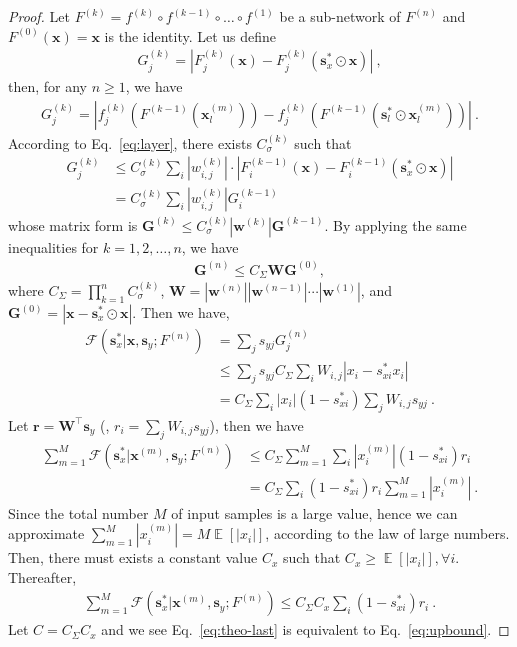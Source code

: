 \documentclass[10pt,twocolumn,letterpaper]{article}
\def\mb{\mathbf}
\begin{document}
\begin{proof}Let $F^{(k)}=f^{(k)}\circ f^{(k-1)}\circ\dots\circ f^{(1)}$ be a sub-network of $F^{(n)}$ and $F^{(0)}(\mb x)=\mb x$ is the identity. Let us define
\begin{align}
G^{(k)}_j=|F_{j}^{(k)}(\mb x)-F_{j}^{(k)}(\mb s^*_x\odot\mb x)|~,\nonumber
\end{align}
then, for any $n\ge 1$, we have
\begin{align}
    G^{(k)}_j=|f^{(k)}_j(F^{(k-1)}(\mb x^{(m)}_l))-f^{(k)}_j(F^{(k-1)}(\mb s^*_l\odot\mb x^{(m)}_l))|\nonumber~.
    \end{align}
    According to Eq.~\ref{eq:layer}, there exists $C_\sigma^{(k)}$ such that
    \begin{align}
    G^{(k)}_j
    &\le C_\sigma^{(k)}\sum_{i}|w_{i,j}^{(k)}|\cdot|F^{(k-1)}_{i}(\mb x)-F_{i}^{(k-1)}(\mb s^*_x\odot\mb x)|\nonumber\\
    &= C_\sigma^{(k)}\sum_{i}|w_{i,j}^{(k)}|G^{(k-1)}_i\nonumber
\end{align}
whose matrix form is
$\mb G^{(k)}\le C_\sigma^{(k)}|\mb w^{(k)}|\mb G^{(k-1)}$.
By applying the same inequalities for $k=1,2,\ldots,n$, we have
\begin{align}
\mb G^{(n)}\le C_\Sigma\mb W\mb G^{(0)},\nonumber
\end{align}
where $C_\Sigma=\prod_{k=1}^n C_\sigma^{(k)}$, $\mb W=|\mb w^{(n)}||\mb w^{(n-1)}|\cdots|\mb w^{(1)}|$, and $\mb G^{(0)}=|\mb x - \mb s^*_x\odot\mb x|$. Then we have,
\begin{align}
\mathcal{F}(\mb s^*_x|\mb x, \mb s_y; F^{(n)})&=\sum_j s_{yj}G_j^{(n)}\nonumber\\
&\le \sum_j s_{yj}C_\Sigma\sum_iW_{i,j}|x_i - s^*_{xi}x_i|\nonumber\\
&= C_\Sigma\sum_i |x_i|(1-s^*_{xi})\sum_j W_{i,j}s_{yj}\nonumber~.
\end{align}
Let $\mb r=\mb W^\intercal \mb s_y$ (\ie, $r_i=\sum_j W_{i,j}s_{yj}$), then we have
\begin{align}
\sum_{m=1}^M\mathcal{F}(\mb s^*_x|\mb x^{(m)}, \mb s_y; F^{(n)})&\le C_\Sigma\sum_{m=1}^M\sum_i |x_i^{(m)}|(1-s^*_{xi})r_{i}\nonumber\\
&=C_\Sigma\sum_i(1-s^*_{xi})r_i\sum_{m=1}^M|x_i^{(m)}|\nonumber~.
\end{align}
Since the total number $M$ of input samples is a large value, hence we can approximate  $\sum_{m=1}^M|x_i^{(m)}|=M\mathop{\mathbb{E}}[|x_i|]$,  according to the law of large numbers. Then, there must exists a constant value $C_x$ such that $C_x\ge \mathop{\mathbb{E}}[|x_i|], \forall i$. Thereafter,
\begin{align}
\sum_{m=1}^M\mathcal{F}(\mb s^*_x|\mb x^{(m)}, \mb s_y; F^{(n)})\le C_\Sigma C_x\sum_i(1-s^*_{xi})r_i~.\label{eq:theo-last}
\end{align}
Let $C=C_\Sigma C_x$ and we see Eq.~\ref{eq:theo-last} is equivalent to Eq.~\ref{eq:upbound}.
\end{proof}
\end{document}
